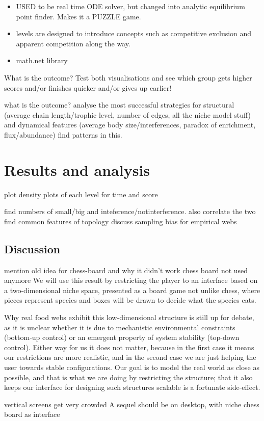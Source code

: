 \begin{itemize}
  \item USED to be real time ODE solver, but changed into analytic equilibrium point finder. Makes it a PUZZLE game.
  \item levels are designed to introduce concepts such as competitive exclusion and apparent competition along the way.
  \item math.net library
\end{itemize}


What is the outcome? Test both visualisations and see which group gets higher scores and/or finishes quicker and/or gives up earlier!

what is the outcome? analyse the most successful strategies for structural (average chain length/trophic level, number of edges, all the niche model stuff) and dynamical features (average body size/interferences, paradox of enrichment, flux/abundance)
find patterns in this.

\section{Results and analysis}

plot density plots of each level for time and score

find numbers of small/big and inteference/notinterference. also correlate the two
find common features of topology
discuss sampling bias for empirical webs

\subsection{Discussion}
  mention old idea for chess-board and why it didn't work
     chess board not used anymore
        We will use this result by restricting the player to an interface based on a two-dimensional niche space, presented as a board game not unlike chess, where pieces represent species and boxes will be drawn to decide what the species eats.

        Why real food webs exhibit this low-dimensional structure is still up for debate, as it is unclear whether it is due to mechanistic environmental constraints (bottom-up control) or an emergent property of system stability (top-down control).
        Either way for us it does not matter, because in the first case it means our restrictions are more realistic, and in the second case we are just helping the user towards stable configurations.
        Our goal is to model the real world as close as possible, and that is what we are doing by restricting the structure; that it also keeps our interface for designing such structures scalable is a fortunate side-effect.

vertical screens get very crowded
A sequel should be on desktop, with niche chess board as interface